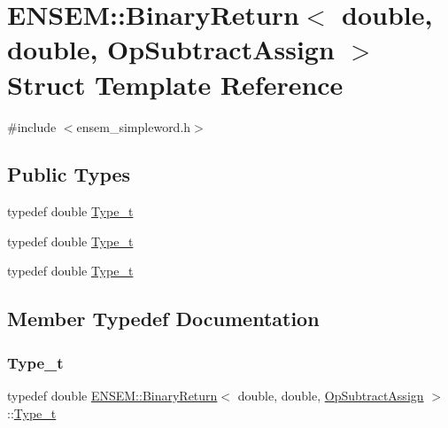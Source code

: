 \hypertarget{structENSEM_1_1BinaryReturn_3_01double_00_01double_00_01OpSubtractAssign_01_4}{}\section{E\+N\+S\+EM\+:\+:Binary\+Return$<$ double, double, Op\+Subtract\+Assign $>$ Struct Template Reference}
\label{structENSEM_1_1BinaryReturn_3_01double_00_01double_00_01OpSubtractAssign_01_4}


{\ttfamily \#include $<$ensem\+\_\+simpleword.\+h$>$}

\subsection*{Public Types}
\begin{DoxyCompactItemize}
\item 
typedef double \mbox{\hyperlink{structENSEM_1_1BinaryReturn_3_01double_00_01double_00_01OpSubtractAssign_01_4_ace697e1191a85ef3c635e6d0d147e1b3}{Type\+\_\+t}}
\item 
typedef double \mbox{\hyperlink{structENSEM_1_1BinaryReturn_3_01double_00_01double_00_01OpSubtractAssign_01_4_ace697e1191a85ef3c635e6d0d147e1b3}{Type\+\_\+t}}
\item 
typedef double \mbox{\hyperlink{structENSEM_1_1BinaryReturn_3_01double_00_01double_00_01OpSubtractAssign_01_4_ace697e1191a85ef3c635e6d0d147e1b3}{Type\+\_\+t}}
\end{DoxyCompactItemize}


\subsection{Member Typedef Documentation}
\mbox{\label{structENSEM_1_1BinaryReturn_3_01double_00_01double_00_01OpSubtractAssign_01_4_ace697e1191a85ef3c635e6d0d147e1b3}} 
\subsubsection{\texorpdfstring{Type\_t}{Type\_t}\hspace{0.1cm}{\footnotesize\ttfamily [1/3]}}
{\footnotesize\ttfamily typedef double \mbox{\hyperlink{structENSEM_1_1BinaryReturn}{E\+N\+S\+E\+M\+::\+Binary\+Return}}$<$ double, double, \mbox{\hyperlink{structENSEM_1_1OpSubtractAssign}{Op\+Subtract\+Assign}} $>$\+::\mbox{\hyperlink{structENSEM_1_1BinaryReturn_3_01double_00_01double_00_01OpSubtractAssign_01_4_ace697e1191a85ef3c635e6d0d147e1b3}{Type\+\_\+t}}}

